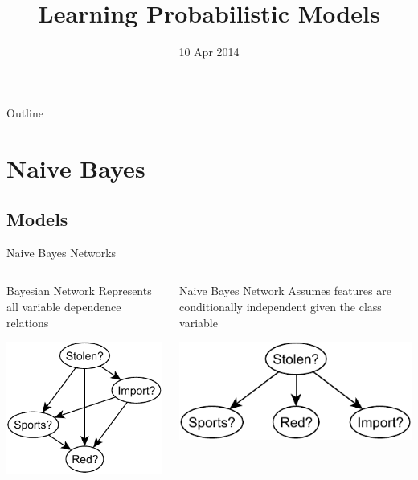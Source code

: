 \documentclass[14pt]{beamer}
\title{Learning Probabilistic Models}
\date[]{10 Apr 2014}
\begin{document}
\begin{frame}
	\titlepage
\end{frame}

\begin{frame}{Outline}
	\tableofcontents
\end{frame}

\section{Naive Bayes}
\subsection{Models}
\begin{frame}{Naive Bayes Networks}
	\begin{columns}[t]
		\begin{column}{2in}
			\begin{block}{Bayesian Network}
				Represents all variable dependence relations
			\end{block}
			\begin{center}
				\includegraphics[scale=.75]{stolen-bayes-net}
			\end{center}
		\end{column}
		\pause
		\begin{column}{2in}
			\begin{block}{Naive Bayes Network}
				Assumes features are conditionally independent given the class variable
			\end{block}
			\begin{center}
				\includegraphics[scale=.75]{stolen-naive-bayes}
			\end{center}
		\end{column}
	\end{columns}
\end{frame}
\end{document}
